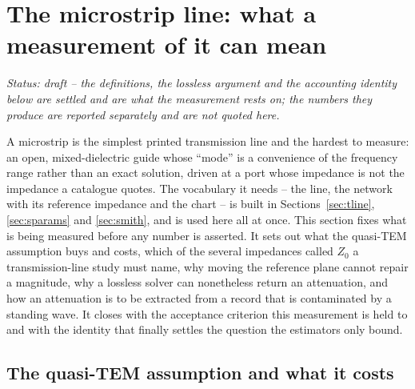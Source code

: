 \section{The microstrip line: what a measurement of it can mean}
\label{sec:microstrip}

\noindent\emph{Status: draft -- the definitions, the lossless argument and the accounting identity below are
settled and are what the measurement rests on; the numbers they produce are reported separately and are not
quoted here.}

A microstrip is the simplest printed transmission line and the hardest to measure: an open, mixed-dielectric
guide whose ``mode'' is a convenience of the frequency range rather than an exact solution, driven at a port
whose impedance is not the impedance a catalogue quotes. The vocabulary it needs -- the line, the network with
its reference impedance and the chart -- is built in Sections~\ref{sec:tline}, \ref{sec:sparams} and
\ref{sec:smith}, and is used here all at once. This section fixes what is being measured before any number is
asserted. It sets out what the quasi-TEM assumption buys and costs, which of the several impedances
called $Z_0$ a transmission-line study must name, why moving the reference plane cannot repair a magnitude,
why a lossless solver can nonetheless return an attenuation, and how an attenuation is to be extracted from a
record that is contaminated by a standing wave. It closes with the acceptance criterion this measurement is
held to and with the identity that finally settles the question the estimators only bound.

\subsection{The quasi-TEM assumption and what it costs}
\label{sec:ms-quasithem}

